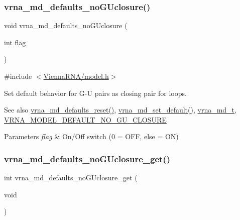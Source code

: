 \subsubsection{\texorpdfstring{vrna\+\_\+md\+\_\+defaults\+\_\+no\+G\+Uclosure()}{vrna\_md\_defaults\_noGUclosure()}}
{\footnotesize\ttfamily void vrna\+\_\+md\+\_\+defaults\+\_\+no\+G\+Uclosure (\begin{DoxyParamCaption}\item[{int}]{flag }\end{DoxyParamCaption})}



{\ttfamily \#include $<$\hyperlink{model_8h}{Vienna\+R\+N\+A/model.\+h}$>$}



Set default behavior for G-\/U pairs as closing pair for loops. 

\begin{DoxySeeAlso}{See also}
\hyperlink{group__model__details_ga70834424cf804d149937de89f80ceb45}{vrna\+\_\+md\+\_\+defaults\+\_\+reset()}, \hyperlink{group__model__details_ga8ac6ff84936282436f822644bf841f66}{vrna\+\_\+md\+\_\+set\+\_\+default()}, \hyperlink{group__model__details_ga1f8a10e12a0a1915f2a4eff0b28ea17c}{vrna\+\_\+md\+\_\+t}, \hyperlink{group__model__details_ga5308de46faaca4b9fd16045864901ee7}{V\+R\+N\+A\+\_\+\+M\+O\+D\+E\+L\+\_\+\+D\+E\+F\+A\+U\+L\+T\+\_\+\+N\+O\+\_\+\+G\+U\+\_\+\+C\+L\+O\+S\+U\+RE} 
\end{DoxySeeAlso}

\begin{DoxyParams}{Parameters}
{\em flag} & On/\+Off switch (0 = O\+FF, else = ON) \\
\hline
\end{DoxyParams}
\mbox{\label{group__model__details_ga4f7fdad083243a5348d63320ddaa70f3}} 
\subsubsection{\texorpdfstring{vrna\+\_\+md\+\_\+defaults\+\_\+no\+G\+Uclosure\+\_\+get()}{vrna\_md\_defaults\_noGUclosure\_get()}}
{\footnotesize\ttfamily int vrna\+\_\+md\+\_\+defaults\+\_\+no\+G\+Uclosure\+\_\+get (\begin{DoxyParamCaption}\item[{void}]{ }\end{DoxyParamCaption})}



